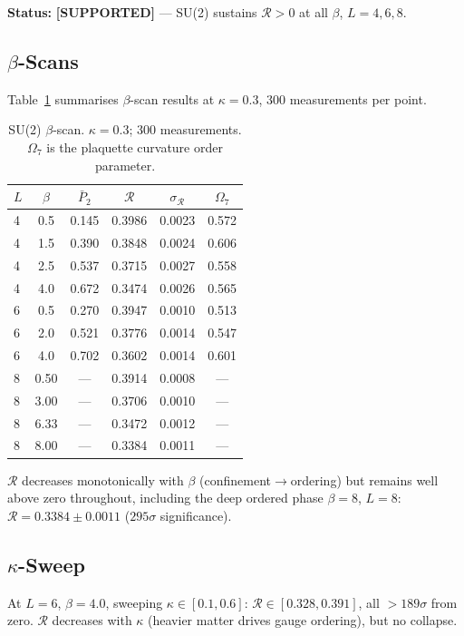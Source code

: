 \documentclass[12pt,a4paper]{article}
\newcommand{\R}{\mathcal{R}}           %
\newcommand{\supported}{\textcolor{blue!70!black}{\textbf{[SUPPORTED]}}}
\theoremstyle{plain}
\theoremstyle{definition}
\theoremstyle{remark}
\begin{document}
\begin{statusbox}
\textbf{Status:} \supported{} --- SU(2) sustains $\R>0$ at all $\beta$, $L=4,6,8$.
\end{statusbox}

\subsection{$\beta$-Scans}

Table~\ref{tab:su2_bscan} summarises $\beta$-scan results at $\kappa=0.3$,
300 measurements per point.

\begin{table}[ht]
\centering
\caption{SU(2) $\beta$-scan. $\kappa=0.3$; 300 measurements. $\Omega_7$ is the
plaquette curvature order parameter.}
\label{tab:su2_bscan}
\begin{tabular}{lccccc}
\toprule
$L$ & $\beta$ & $\bar{P}_2$ & $\R$ & $\sigma_\R$ & $\Omega_7$ \\
\midrule
4 & 0.5  & 0.145 & 0.3986 & 0.0023 & 0.572 \\
4 & 1.5  & 0.390 & 0.3848 & 0.0024 & 0.606 \\
4 & 2.5  & 0.537 & 0.3715 & 0.0027 & 0.558 \\
4 & 4.0  & 0.672 & 0.3474 & 0.0026 & 0.565 \\
\midrule
6 & 0.5  & 0.270 & 0.3947 & 0.0010 & 0.513 \\
6 & 2.0  & 0.521 & 0.3776 & 0.0014 & 0.547 \\
6 & 4.0  & 0.702 & 0.3602 & 0.0014 & 0.601 \\
\midrule
8 & 0.50 & ---   & 0.3914 & 0.0008 & --- \\
8 & 3.00 & ---   & 0.3706 & 0.0010 & --- \\
8 & 6.33 & ---   & 0.3472 & 0.0012 & --- \\
8 & 8.00 & ---   & 0.3384 & 0.0011 & --- \\
\bottomrule
\end{tabular}
\end{table}

$\R$ decreases monotonically with $\beta$ (confinement$\to$ordering) but remains
well above zero throughout, including the deep ordered phase $\beta=8$, $L=8$:
$\R=0.3384\pm0.0011$ ($295\sigma$ significance).

\subsection{$\kappa$-Sweep}

At $L=6$, $\beta=4.0$, sweeping $\kappa\in[0.1,0.6]$:
$\R\in[0.328,0.391]$, all $>189\sigma$ from zero.
$\R$ decreases with $\kappa$ (heavier matter drives gauge ordering), but no collapse.
\end{document}
